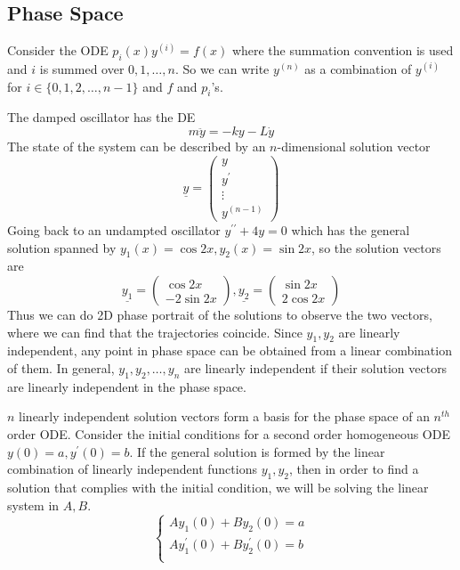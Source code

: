\subsection{Phase Space}
Consider the ODE $p_i(x)y^{(i)}=f(x)$ where the summation convention is used and $i$ is summed over $0,1,\ldots,n$.
So we can write $y^{(n)}$ as a combination of $y^{(i)}$ for $i\in\{0,1,2,\ldots,n-1\}$ and $f$ and $p_i$'s.
\begin{example}
    The damped oscillator has the DE
    $$m\ddot{y}=-ky-L\dot{y}$$
    The state of the system can be described by an $n$-dimensional solution vector
    $$\underline{y}=
    \begin{pmatrix}
        y\\
        y^\prime\\
        \vdots\\
        y^{(n-1)}
    \end{pmatrix}$$
    Going back to an undampted oscillator $y^{\prime\prime}+4y=0$ which has the general solution spanned by $y_1(x)=\cos{2x}, y_2(x)=\sin{2x}$, so the solution vectors are
    $$\underline{y_1}=
    \begin{pmatrix}
        \cos{2x}\\
        -2\sin{2x}
    \end{pmatrix},
    \underline{y_2}=
    \begin{pmatrix}
        \sin{2x}\\
        2\cos{2x}
    \end{pmatrix}$$
    Thus we can do 2D phase portrait of the solutions to observe the two vectors, where we can find that the trajectories coincide.
    Since $y_1,y_2$ are linearly independent, any point in phase space can be obtained from a linear combination of them.
    In general, $y_1,y_2,\ldots, y_n$ are linearly independent if their solution vectors are linearly independent in the phase space.
\end{example}
$n$ linearly independent solution vectors form a basis for the phase space of an $n^{th}$ order ODE.
Consider the initial conditions for a second order homogeneous ODE $y(0)=a,y^\prime(0)=b$.
If the general solution is formed by the linear combination of linearly independent functions $y_1,y_2$, then in order to find a solution that complies with the initial condition, we will be solving the linear system in $A,B$.
$$
\begin{cases}
    Ay_1(0)+By_2(0)=a\\
    Ay_1^\prime(0)+By_2^\prime(0)=b\\
\end{cases}
$$
